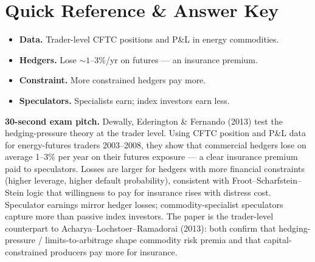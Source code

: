 \documentclass[11pt]{article}
\begin{document}
\section*{Quick Reference \& Answer Key}
\begin{answerbox}
\begin{itemize}
\item \textbf{Data.} Trader-level CFTC positions and P\&L in energy commodities.
\item \textbf{Hedgers.} Lose $\sim 1$--$3\%$/yr on futures --- an insurance premium.
\item \textbf{Constraint.} More constrained hedgers pay more.
\item \textbf{Speculators.} Specialists earn; index investors earn less.
\end{itemize}
\end{answerbox}

\begin{keybox}
\textbf{30-second exam pitch.} Dewally, Ederington \& Fernando (2013) test the hedging-pressure theory at the trader level. Using CFTC position and P\&L data for energy-futures traders 2003--2008, they show that commercial hedgers lose on average 1--3\% per year on their futures exposure --- a clear insurance premium paid to speculators. Losses are larger for hedgers with more financial constraints (higher leverage, higher default probability), consistent with Froot--Scharfstein--Stein logic that willingness to pay for insurance rises with distress cost. Speculator earnings mirror hedger losses; commodity-specialist speculators capture more than passive index investors. The paper is the trader-level counterpart to Acharya--Lochstoer--Ramadorai (2013): both confirm that hedging-pressure / limits-to-arbitrage shape commodity risk premia and that capital-constrained producers pay more for insurance.
\end{keybox}
\end{document}
